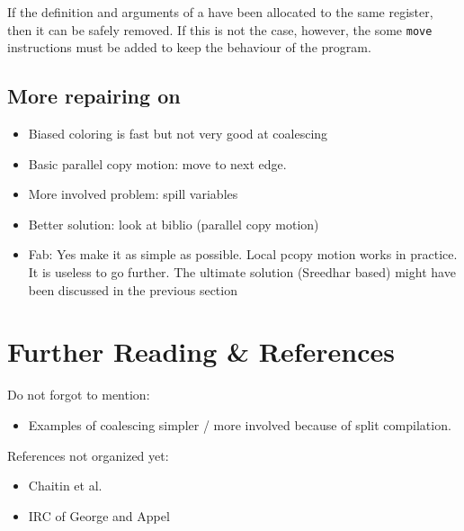 {If the definition and arguments 
of a \phifun have been allocated to the same register, then it can be safely 
removed. If this is not the case, however, the some {\tt move} instructions 
must be added to keep the behaviour of the program. 



\subsection{More repairing on \phifuns}
\begin{itemize}
  \item Biased coloring is fast but not very good at coalescing
  \item Basic parallel copy motion: move to next edge.
  \item More involved problem: spill variables
  \item Better solution: look at biblio (parallel copy motion)
  \item Fab: Yes make it as simple as possible. Local pcopy motion works in practice. It is useless to go further. The ultimate solution (Sreedhar based) might have been discussed in the previous section
\end{itemize}


\section{Further Reading \& References}

Do not forgot to mention:
\begin{itemize}
  \item Examples of coalescing simpler / more involved because of split compilation.
\end{itemize}

References not organized yet:
\begin{itemize}
\item Chaitin et al.~\cite{chaitin:1981:register}
\item IRC of George and Appel~\cite{george:96:iterated}
\end{itemize}

\endofchapter
}

